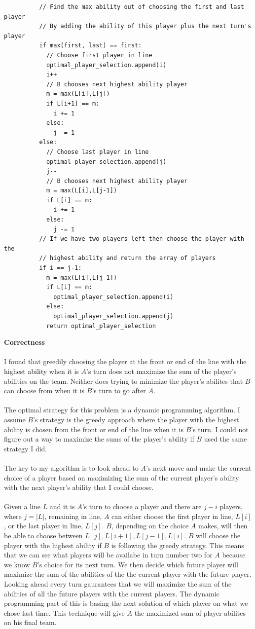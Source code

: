 \documentclass[12pt]{article}
\begin{document}
\begin{enumerate}
\begin{verbatim}
		  // Find the max ability out of choosing the first and last player
		  // By adding the ability of this player plus the next turn's player
		  if max(first, last) == first:
		    // Choose first player in line
		    optimal_player_selection.append(i)
		    i++
		    // B chooses next highest ability player
		    m = max(L[i],L[j])
		    if L[i+1] == m:
		  	  i += 1
		    else:
		      j -= 1
		  else:
		    // Choose last player in line
		    optimal_player_selection.append(j)
		    j--
		    // B chooses next highest ability player
		    m = max(L[i],L[j-1])
		    if L[i] == m:
		  	  i += 1
		    else:
		      j -= 1
		  // If we have two players left then choose the player with the 
		  // highest ability and return the array of players 
		  if i == j-1:
		    m = max(L[i],L[j-1])
		    if L[i] == m:
		  	  optimal_player_selection.append(i)
		    else:
		      optimal_player_selection.append(j)
		    return optimal_player_selection
		\end{verbatim}
		\textbf{Correctness}\\
		\\
		I found that greedily choosing the player at the front or end of the line with the highest ability when it is $A$'s turn does not maximize the sum of the player's abilities on the team.  Neither does trying to minimize the player's abilites that $B$ can choose from when it is $B$'s turn to go after $A$.\\
		\\
		The optimal strategy for this problem is a dynamic programming algorithm.  I assume $B$'s strategy is the greedy approach where the player with the highest ability is chosen from the front or end of the line when it is $B$'s turn.  I could not figure out a way to maximize the sums of the player's ability if $B$ used the same strategy I did.\\
		\\
		The key to my algorithm is to look ahead to $A$'s next move and make the current choice of a player based on maximizing the sum of the current player's ability with the next player's ability that I could choose.\\
    \\
		Given a line $L$ and it is $A$'s turn to choose a player and there are $j - i$ players, where $j = |L|$, remaining in line, $A$ can either choose the first player in line, $L[i]$, or the last player in line, $L[j]$.  $B$, depending on the choice $A$ makes, will then be able to choose between $L[j], L[i+1], L[j-1], L[i]$.  $B$ will choose the player with the highest ability if $B$ is following the greedy strategy.  This means that we can see what players will be availabe in turn number two for $A$ because we know $B$'s choice for its next turn.  We then decide which future player will maximize the sum of the abilities of the the current player with the future player.  Looking ahead every turn gaurantees that we will maximize the sum of the abilities of all the future players with the current players.  The dynamic programming part of this is basing the next solution of which player on what we chose last time.  This technique will give $A$ the maximized sum of player abilites on his final team.\\    

\end{enumerate}
\end{document}
